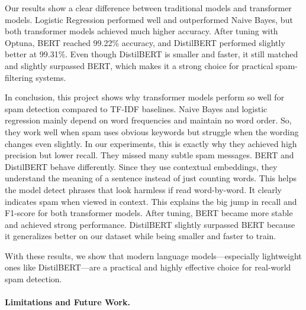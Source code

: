 \documentclass{article}
\begin{document}
Our results show a clear difference between traditional models and transformer models. Logistic Regression performed well and outperformed Naive Bayes, but both transformer models achieved much higher accuracy. After tuning with Optuna, BERT reached 99.22\% accuracy, and DistilBERT performed slightly better at 99.31\%. Even though DistilBERT is smaller and faster, it still matched and slightly surpassed BERT, which makes it a strong choice for practical spam-filtering systems.

In conclusion, this project shows why transformer models perform so well for spam detection compared to TF-IDF baselines. Naive Bayes and logistic regression mainly depend on word frequencies and maintain no word order. So, they work well when spam uses obvious keywords but struggle when the wording changes even slightly. In our experiments, this is exactly why they achieved high precision but lower recall. They missed many subtle spam messages. BERT and DistilBERT behave differently. Since they use contextual embeddings, they understand the meaning of a sentence instead of just counting words. This helps the model detect phrases that look harmless if read word-by-word. It clearly indicates spam when viewed in context. This explains the big jump in recall and F1-score for both transformer models. After tuning, BERT became more stable and achieved strong performance. DistilBERT slightly surpassed BERT because it generalizes better on our dataset while being smaller and faster to train.



With these results, we show that modern language models—especially lightweight ones like DistilBERT—are a practical and highly effective choice for real-world spam detection.


\paragraph{Limitations and Future Work.}
\end{document}

